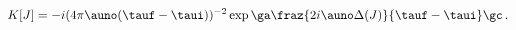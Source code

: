 \begin{equation}
 K[J]=-i(4\pi \auno(\tauf-\taui))^{-2}
 \exp\ga \fraz{2i\auno\Delta(J)}{\tauf-\taui} \gc\,.
 \label{KJJ}
\end{equation}

